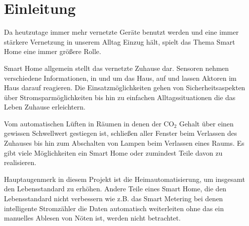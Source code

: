 \documentclass[12pt, oneside, smallheadings]{scrbook}
\begin{document}



\setcounter{page}{1}
\setcounter{tocdepth}{1}

\clearpage
{}
\tableofcontents
\thispagestyle{plain}

\printglossary[type=\acronymtype, title=Akronymverzeichnis,toctitle=Akronymverzeichnis]
\printglossary[type=main,title=Glossar,toctitle=Glossar]

\listoftables
{}

\listoffigures
{}


\clearpage
{}
\setcounter{page}{1}

\pagestyle{scrheadings}

\chapter{Einleitung} 
Da heutzutage immer mehr vernetzte Geräte benutzt werden und eine immer stärkere Vernetzung in unserem Alltag Einzug hält, spielt das Thema Smart Home eine immer größere Rolle.

Smart Home allgemein stellt das vernetzte Zuhause dar. Sensoren nehmen verschiedene Informationen, in und um das Haus, auf und lassen Aktoren im Haus darauf reagieren. Die Einsatzmöglichkeiten gehen von Sicherheitsaspekten über Stromsparmöglichkeiten bis hin zu einfachen Alltagssituationen die das Leben Zuhause erleichtern.

Vom automatischen Lüften in Räumen in denen der CO$_2$ Gehalt über einen gewissen Schwellwert gestiegen ist, schließen aller Fenster beim Verlassen des Zuhauses bis hin zum Abschalten von Lampen beim Verlassen eines Raums. Es gibt viele Möglichkeiten ein Smart Home oder zumindest Teile davon zu realisieren.

Hauptaugenmerk in diesem Projekt ist die Heimautomatisierung, um insgesamt den Lebensstandard zu erhöhen. Andere Teile eines Smart Home, die den Lebensstandard nicht verbessern wie z.B. das Smart Metering bei denen intelligente Stromzähler die Daten automatisch weiterleiten ohne das ein manuelles Ablesen von Nöten ist, werden nicht betrachtet.
\end{document}
